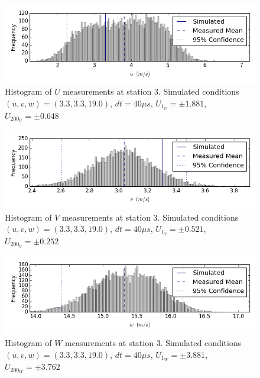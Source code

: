\begin{figure}[H]
\centering
\includegraphics[width=6in]{figs/Ely_May28th03002/uncertainty_Ely_May28th03002_U}
\caption{Histogram of $U$ measurements at station 3. Simulated conditions $(u,v,w)=(3.3, 3.3, 19.0)$, $dt=40 \mu s$, $U_{1_{U}}=\pm 1.881$, $U_{200_{U}}=\pm 0.648$}
\label{fig:uncertainty_Ely_May28th03002_U}
\end{figure}


\begin{figure}[H]
\centering
\includegraphics[width=6in]{figs/Ely_May28th03002/uncertainty_Ely_May28th03002_V}
\caption{Histogram of $V$ measurements at station 3. Simulated conditions $(u,v,w)=(3.3, 3.3, 19.0)$, $dt=40 \mu s$, $U_{1_{V}}=\pm 0.521$, $U_{200_{V}}=\pm 0.252$}
\label{fig:uncertainty_Ely_May28th03002_V}
\end{figure}


\begin{figure}[H]
\centering
\includegraphics[width=6in]{figs/Ely_May28th03002/uncertainty_Ely_May28th03002_W}
\caption{Histogram of $W$ measurements at station 3. Simulated conditions $(u,v,w)=(3.3, 3.3, 19.0)$, $dt=40 \mu s$, $U_{1_{W}}=\pm 3.881$, $U_{200_{W}}=\pm 3.762$}
\label{fig:uncertainty_Ely_May28th03002_W}
\end{figure}


